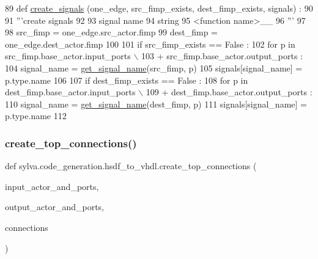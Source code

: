 \begin{DoxyCode}
89 \textcolor{keyword}{def }\hyperlink{namespacesylva_1_1code__generation_1_1hsdf__to__vhdl_a7b3765f9d22f02a29cb6ecfb267ae7f0}{create\_signals} (one\_edge, src\_fimp\_exists, dest\_fimp\_exists, signals) :
90 
91   \textcolor{stringliteral}{'''create signals}
92 \textcolor{stringliteral}{}
93 \textcolor{stringliteral}{    signal name}
94 \textcolor{stringliteral}{      string}
95 \textcolor{stringliteral}{      <function name>\_<fimp index>\_<port name>}
96 \textcolor{stringliteral}{  '''}
97 
98   src\_fimp = one\_edge.src\_actor.fimp
99   dest\_fimp = one\_edge.dest\_actor.fimp
100 
101   \textcolor{keywordflow}{if} src\_fimp\_exists == \textcolor{keyword}{False} :
102     \textcolor{keywordflow}{for} p \textcolor{keywordflow}{in} src\_fimp.base\_actor.input\_ports \(\backslash\)
103            + src\_fimp.base\_actor.output\_ports :
104       signal\_name = \hyperlink{namespacesylva_1_1code__generation_1_1hsdf__to__vhdl_adfe6fda6b02f34c7fd4f2775ced8228f}{get\_signal\_name}(src\_fimp, p)
105       signals[signal\_name] = p.type.name
106 
107   \textcolor{keywordflow}{if} dest\_fimp\_exists == \textcolor{keyword}{False} :
108     \textcolor{keywordflow}{for} p \textcolor{keywordflow}{in} dest\_fimp.base\_actor.input\_ports \(\backslash\)
109            + dest\_fimp.base\_actor.output\_ports :
110       signal\_name = \hyperlink{namespacesylva_1_1code__generation_1_1hsdf__to__vhdl_adfe6fda6b02f34c7fd4f2775ced8228f}{get\_signal\_name}(dest\_fimp, p)
111       signals[signal\_name] = p.type.name
112 
\end{DoxyCode}
\mbox{\label{namespacesylva_1_1code__generation_1_1hsdf__to__vhdl_a09020e1a1ea5a2d3e4b8cdd35f51a185}} 
\subsubsection{\texorpdfstring{create\+\_\+top\+\_\+connections()}{create\_top\_connections()}}
{\footnotesize\ttfamily def sylva.\+code\+\_\+generation.\+hsdf\+\_\+to\+\_\+vhdl.\+create\+\_\+top\+\_\+connections (\begin{DoxyParamCaption}\item[{}]{input\+\_\+actor\+\_\+and\+\_\+ports,  }\item[{}]{output\+\_\+actor\+\_\+and\+\_\+ports,  }\item[{}]{connections }\end{DoxyParamCaption})}

